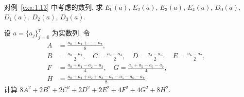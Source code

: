 \begin{exercise}\label{exer:1.22}
对例~\ref{exa:1.13} 中考虑的数列, 求 $E_{0}(a)$, $E_{2}(a)$, $E_{3}(a)$, $E_{4}(a)$, $D_{0}(a)$, $D_{1}(a)$, $D_{2}(a)$, $D_{3}(a)$.
\end{exercise}

\begin{exercise}\label{exer:1.23}
设 $a = \{a_{j}\}_{j=0}^{7}$ 为实数列. 令
\begin{align*}
A &= \frac{a_{0}+a_{1}+\cdots+a_{7}}{8}, \\
B &= \frac{a_{0}-a_{1}}{2}, \quad C = \frac{a_{2}-a_{3}}{2}, \quad D = \frac{a_{4}-a_{5}}{2}, \quad E = \frac{a_{6}-a_{7}}{2}, \\
F &= \frac{a_{0}+a_{1}-a_{2}-a_{3}}{4}, \quad G = \frac{a_{4}+a_{5}-a_{6}-a_{7}}{4}, \\
H &= \frac{a_{0}+a_{1}+a_{2}+a_{3}-a_{4}-a_{5}-a_{6}-a_{7}}{8}.
\end{align*}
计算 $8A^{2} + 2B^{2} + 2C^{2} + 2D^{2} + 2E^{2} + 4F^{2} + 4G^{2} + 8H^{2}$.
\end{exercise}
